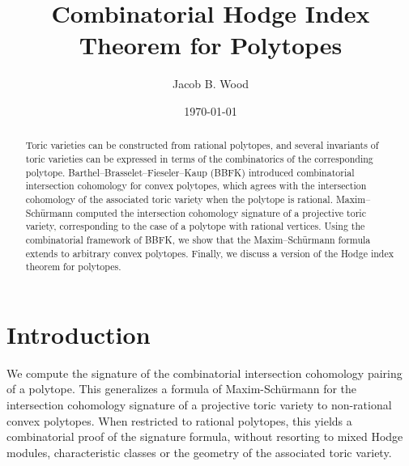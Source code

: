 \documentclass[12pt,leqno,twoside]{amsart}
\begin{document}
\title{Combinatorial Hodge Index Theorem for Polytopes}
\author{Jacob B. Wood} %
\address{Department of Mathematics, University of Wisconsin-Madison, 480 Lincoln Drive, Madison WI 53706-1388, USA}

\begin{abstract}

Toric varieties can be constructed from rational polytopes, and several invariants of toric varieties can be expressed in terms of the combinatorics of the corresponding polytope. Barthel--Brasselet--Fieseler--Kaup (BBFK) introduced combinatorial intersection cohomology for convex polytopes, which agrees with the intersection cohomology of the associated toric variety when the polytope is rational. Maxim--Sch\"urmann computed the intersection cohomology signature of a projective toric variety, corresponding to the case of a polytope with rational vertices. Using the combinatorial framework of BBFK, we show that the Maxim--Sch\"urmann formula extends to arbitrary convex polytopes. Finally, we discuss a version of the Hodge index theorem for polytopes.
    
\end{abstract}

\date{\today}



\maketitle

\section{Introduction}



        We compute the signature of the combinatorial intersection cohomology pairing of a polytope. This generalizes a formula of Maxim-Sch\"urmann \cite[Example 5.8, Example 6.7]{MS} for the intersection cohomology signature of a projective toric variety to non-rational convex polytopes. When restricted to rational polytopes, this yields a combinatorial proof of the signature formula, without resorting to mixed Hodge modules, characteristic classes or the geometry of the associated toric variety. 
    
\end{document}
